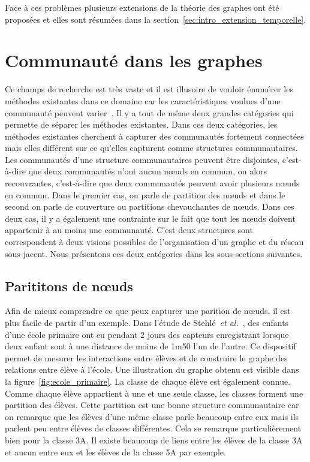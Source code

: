 Face à ces problèmes plusieurs extensions de la théorie des graphes ont été proposées et elles sont résumées dans la section~\ref{sec:intro_extension_temporelle}.



\section{Communauté dans les graphes}
\label{sec:intro_communaute}

Ce champs de recherche est très vaste et il est illusoire de vouloir énumérer les méthodes existantes dans ce domaine car les caractéristiques voulues d'une communauté peuvent varier~\cite{Coscia2011,Leskovec2008,Yang2015,Jeub2015}.
Il y a tout de même deux grandes catégories qui permette de séparer les méthodes existantes.
Dans ces deux catégories, les méthodes existantes cherchent à capturer 
des communautés fortement connectées mais elles différent sur ce qu'elles capturent comme structures communautaires.
Les communautés d'une structure communautaires peuvent être disjointes, c'est-à-dire que deux communautés n'ont aucun n\oe uds en commun, ou alors recouvrantes, c'est-à-dire que deux communautés peuvent avoir plusieurs n\oe uds en commun.
Dans le premier cas, on parle de partition des n\oe uds et dans le second on parle de couverture ou partitions chevauchantes de n\oe uds.
Dans ces deux cas, il y a également une contrainte sur le fait que tout les n\oe uds doivent appartenir à au moins une communauté.
C'est deux structures sont correspondent à deux visions possibles de l'organisation d'un graphe et du réseau sous-jacent.
Nous présentons ces deux catégories dans les sous-sections suivantes.

\subsection{Parititons de n\oe uds}
Afin de mieux comprendre ce que peux capturer une parition de n\oe uds, il est plus facile de partir d'un exemple.
Dans l'étude de Stehlé~\emph{et al.}~\cite{Stehle2011}, des enfants d'une école primaire ont eu pendant 2 jours des capteurs enregistrant lorsque deux enfant sont à une distance de moins de 1m50 l'un de l'autre.
Ce dispositif permet de mesurer les interactions entre élèves et de construire le graphe des relations entre élève à l'école.
Une illustration du graphe obtenu est visible dans la figure~\ref{fig:ecole_primaire}.
La classe de chaque élève est également connue.
Comme chaque élève appartient à une et une seule classe, les classes forment une partition des élèves.
Cette partition est une bonne structure communautaire car on remarque que les élèves d'une même classe parle beaucoup entre eux mais ils parlent peu entre élèves de classes différentes.
Cela se remarque particulièrement bien pour la classe 3A.
Il existe beaucoup de liens entre les élèves de la classe 3A et aucun entre eux et les élèves de la classe 5A par exemple.

